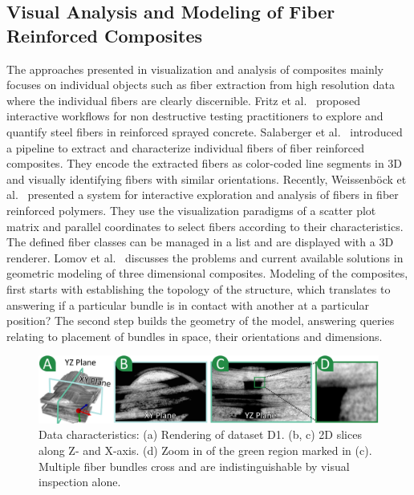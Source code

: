 \subsection {Visual Analysis and Modeling of Fiber Reinforced Composites}
The approaches presented in visualization and analysis of composites mainly focuses on individual objects such as fiber extraction from high resolution data where the individual fibers are clearly discernible. Fritz et al.~\cite{Fritz2009} proposed interactive workflows for non destructive testing practitioners to explore and quantify steel fibers in reinforced sprayed concrete. %
Salaberger et al.~\cite{Salaberger2011} introduced a pipeline to extract and characterize individual fibers of fiber reinforced composites. They encode the extracted fibers as color-coded line segments in 3D and visually identifying fibers with similar orientations.
Recently, Weissenb{\"o}ck et al.~\cite{Weissenbock2014} presented a system for interactive exploration and analysis of fibers in fiber reinforced polymers.
They use the visualization paradigms of a scatter plot matrix and parallel coordinates to select fibers according to their characteristics. The defined fiber classes can be managed in a list and are displayed with a 3D renderer.  
Lomov et al.~\cite{Lomov2010} discusses the problems and current available solutions in geometric modeling of three dimensional composites.
Modeling of the composites, first starts with establishing the topology of the structure, which translates to answering if a particular bundle is in contact with another at a particular position? The second step builds the geometry of the model, answering queries relating to placement of bundles in space, their orientations and dimensions. 
\begin{figure}[htb]
\centering
\includegraphics[width=\linewidth]{images/data-char.eps}
\caption
{
Data characteristics: (a) Rendering of dataset D1. (b, c) 2D slices along Z- and X-axis. (d) Zoom in of the green region marked in (c). Multiple fiber bundles cross and are indistinguishable by visual inspection alone. 
}
\label{fig:data-char}
\end{figure}

